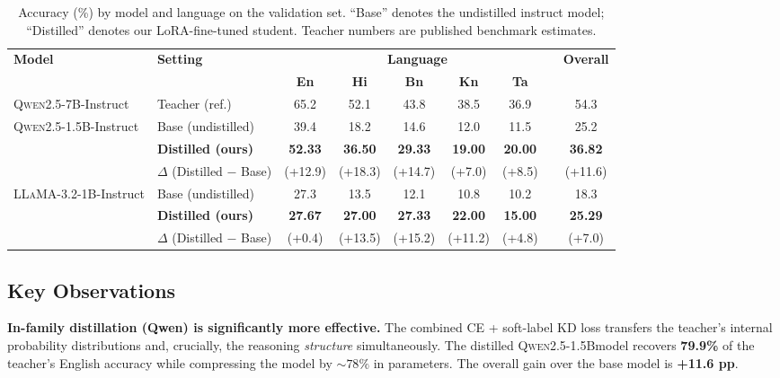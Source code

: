 \documentclass[11pt,a4paper]{article}
\newcommand{\teacher}{\textsc{Qwen2.5-7B}}
\newcommand{\qwen}{\textsc{Qwen2.5-1.5B}}
\newcommand{\llama}{\textsc{LLaMA-3.2-1B}}
\newcommand{\gain}[1]{\textcolor{green!50!black}{(+#1)}}
\begin{document}
\begin{table}[h]
\centering
\small
\caption{Accuracy (\%) by model and language on the validation set.
``Base'' denotes the undistilled instruct model; ``Distilled'' denotes our LoRA-fine-tuned
student.  Teacher numbers are published benchmark estimates.}
\label{tab:results}
\setlength{\tabcolsep}{4pt}
\begin{tabular}{llccccccc}
\toprule
\multirow{2}{*}{\textbf{Model}} & \multirow{2}{*}{\textbf{Setting}} &
  \multicolumn{6}{c}{\textbf{Language}} & \multirow{2}{*}{\textbf{Overall}} \\
\cmidrule(lr){3-8}
 & & \textbf{En} & \textbf{Hi} & \textbf{Bn} & \textbf{Kn} & \textbf{Ta} & & \\
\midrule
\teacher-Instruct & Teacher (ref.) & 65.2 & 52.1 & 43.8 & 38.5 & 36.9 & & 54.3 \\
\midrule
\multirow{2}{*}{\qwen-Instruct}
  & Base (undistilled) & 39.4 & 18.2 & 14.6 & 12.0 & 11.5 & & 25.2 \\
  & \textbf{Distilled (ours)} & \textbf{52.33} & \textbf{36.50} & \textbf{29.33} & \textbf{19.00} & \textbf{20.00} & & \textbf{36.82} \\
\cmidrule(l){2-9}
  & $\Delta$ (Distilled $-$ Base) & \gain{12.9} & \gain{18.3} & \gain{14.7} & \gain{7.0} & \gain{8.5} & & \gain{11.6} \\
\midrule
\multirow{2}{*}{\llama-Instruct}
  & Base (undistilled) & 27.3 & 13.5 & 12.1 & 10.8 & 10.2 & & 18.3 \\
  & \textbf{Distilled (ours)} & \textbf{27.67} & \textbf{27.00} & \textbf{27.33} & \textbf{22.00} & \textbf{15.00} & & \textbf{25.29} \\
\cmidrule(l){2-9}
  & $\Delta$ (Distilled $-$ Base) & \gain{0.4} & \gain{13.5} & \gain{15.2} & \gain{11.2} & \gain{4.8} & & \gain{7.0} \\
\bottomrule
\end{tabular}
\end{table}

\subsection{Key Observations}

\textbf{In-family distillation (Qwen) is significantly more effective.}
The combined CE + soft-label KD loss transfers the teacher's internal probability
distributions and, crucially, the reasoning \emph{structure} simultaneously.  The distilled
\qwen model recovers \textbf{79.9\%} of the teacher's English accuracy while compressing
the model by $\sim\!78\%$ in parameters.  The overall gain over the base model is
\textbf{+11.6 pp}.
\end{document}
